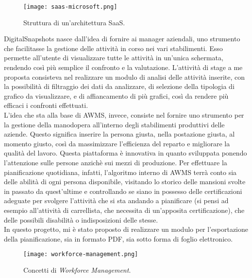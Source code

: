 \begin{figure}[h]
\texttt{[image: saas-microsoft.png]}
\centering
\caption{Struttura di un'architettura SaaS.} 
\label{fig:saas-microsoft}
\end{figure}

DigitalSnapshots nasce dall'idea di fornire ai manager aziendali, uno strumento che facilitasse la gestione delle attività in corso nei vari stabilimenti. Esso permette all'utente di visualizzare tutte le attività in un'unica schermata, rendendo così più semplice il confronto e la valutazione. 
L'attività di stage a me proposta consisteva nel realizzare un modulo di analisi delle attività inserite, con la possibilità di filtraggio dei dati da analizzare, di selezione della tipologia di grafico da visualizzare, e di affiancamento di più grafici, così da rendere più efficaci i confronti effettuati. \\

L'idea che sta alla base di AWMS, invece, consiste nel fornire uno strumento per la gestione della manodopera all'interno degli stabilimenti produttivi delle aziende.
Questo significa inserire la persona giusta, nella postazione giusta, al momento giusto, così da massimizzare l'efficienza del reparto e migliorare la qualità del lavoro.
Questa piattaforma è innovativa in quanto sviluppata ponendo l'attenzione sulle persone anzichè sui mezzi di produzione. Per effettuare la pianificazione quotidiana, infatti, l'algoritmo interno di AWMS terrà conto sia delle abilità di ogni persona disponibile, visitando lo storico delle mansioni svolte in passato da quest'ultime e controllando se siano in possesso delle certificazioni adeguate per svolgere l'attività che si sta andando a pianificare (si pensi ad esempio all'attività di carrellista, che necessita di un'apposita certificazione), che delle possibili disabilità o indisposizioni delle stesse.\\
In questo progetto, mi è stato proposto di realizzare un modulo per l'esportazione della pianificazione, sia in formato PDF, sia sotto forma di foglio elettronico.

\begin{figure}[h]
\texttt{[image: workforce-management.png]}
\centering
\caption{Concetti di \textit{Workforce Management}.} 
\label{fig:workforce-management}
\end{figure}


